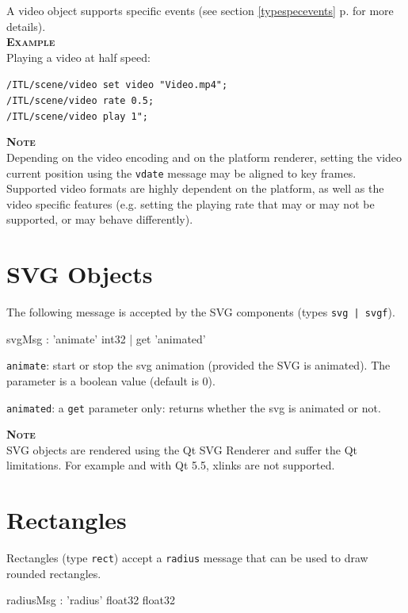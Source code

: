 \documentclass[a4paper,twoside]{report}
\newcommand{\sublevel}[1]	{\section{#1}}
\newcommand{\fullref}[1]	{\ref{#1} p.\pageref{#1}}
\newcommand{\OSC}[1]		{\texttt{#1}}
\newcommand{\example}		{\textbf{\hspace{-1.5cm}\textbf{\textsc{Example }}}}
\newcommand{\note}	[1]		{\vspace{2mm}\textbf{\hspace{-0.9cm}\textbf{\textsc{Note #1}}}}
\let\olditemize\itemize
\let\oldenditemize\enditemize
\renewenvironment{itemize} 	{\olditemize \setlength{\itemsep}{1mm}}{\oldenditemize}
\newcommand{\sample}	[1]			{\vspace{-2mm}\begin{center}\colorbox{mygrey}{
								\begin{minipage}[t]{0.9\columnwidth} 
								{\small \texttt{#1}}
								\end{minipage}}\end{center}}
\begin{document}
A video object supports specific events (see section \fullref{typespecevents} for more details). 
\\

\example \\
Playing a video at half speed:
\sample{/ITL/scene/video set video "Video.mp4"; \\
/ITL/scene/video rate 0.5;\\
/ITL/scene/video play 1";
}

\note \\
Depending on the video encoding and on the platform renderer, setting the video current position using the \OSC{vdate} message may be aligned to key frames.
\\
Supported video formats are highly dependent on the platform, as well as the video specific features (e.g. setting the playing rate that may or may not be supported, or may behave differently).  


\sublevel{SVG Objects}
\label{svgobjects}

The following message is accepted by the SVG components (types \OSC{svg | svgf}).

\begin{rail}
svgMsg :		'animate' int32
		| get 'animated'
\end{rail}

\begin{itemize}
\item \OSC{animate}: start or stop the svg animation (provided the SVG is animated). The parameter is a boolean value (default is 0).
\item \OSC{animated}: a \OSC{get} parameter only: returns whether the svg is animated or not.
\end{itemize}

\note\\
SVG objects are rendered using the Qt SVG Renderer and suffer the Qt limitations. For example and with Qt 5.5, xlinks are not supported.


\sublevel{Rectangles}
\label{rectobjects}

Rectangles (type \OSC{rect}) accept a \OSC{radius} message that can be used to draw rounded rectangles.
\begin{rail}
radiusMsg :		'radius' float32 float32
\end{rail}
\end{document}
